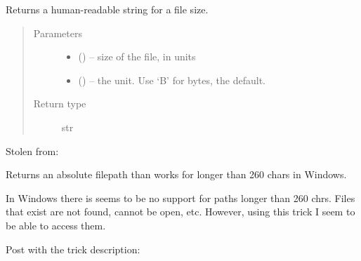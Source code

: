 \documentclass[letterpaper,10pt,english]{sphinxmanual}
\begin{document}
\begin{fulllineitems}
\label{\detokenize{index:fsbackup.fileTools.sizeof_fmt}}
Returns a human-readable string for a file size.
\begin{quote}\begin{description}
\item[{Parameters}] \leavevmode\begin{itemize}
\item {} 
 () -- size of the file, in units

\item {} 
 () -- the unit. Use `B' for bytes, the default.

\end{itemize}

\item[{Return type}] \leavevmode
str

\end{description}\end{quote}

Stolen from:
\begin{quote}

\end{quote}

\end{fulllineitems}


\begin{fulllineitems}
\label{\detokenize{index:fsbackup.fileTools.abspath2longabspath}}
Returns an absolute filepath than works for longer than 260 chars in Windows.

In Windows there is seems to be no support for paths longer than 260 chrs. Files that exist are not found, cannot
be open, etc. However, using this trick I seem to be able to access them.

Post with the trick description:
\begin{quote}

\end{quote}

\end{fulllineitems}
\end{document}
